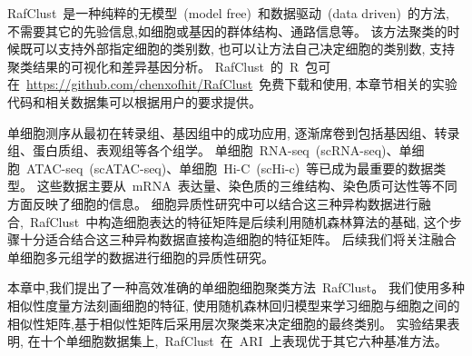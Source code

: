 RafClust~是一种纯粹的无模型~(model free)~和数据驱动~(data driven)~的方法,
不需要其它的先验信息,如细胞或基因的群体结构、通路信息等。
该方法聚类的时候既可以支持外部指定细胞的类别数, 也可以让方法自己决定细胞的类别数,
支持聚类结果的可视化和差异基因分析。
RafClust~的~R~包可在~\url{https://github.com/chenxofhit/RafClust}~免费下载和使用,
本章节相关的实验代码和相关数据集可以根据用户的要求提供。

单细胞测序从最初在转录组、基因组中的成功应用, 逐渐席卷到包括基因组、转录组、蛋白质组、表观组等各个组学。
单细胞~RNA-seq~(scRNA-seq)、单细胞~ATAC-seq~(scATAC-seq)、单细胞~Hi-C~(scHi-c)~等已成为最重要的数据类型。
这些数据主要从~mRNA~表达量、染色质的三维结构、染色质可达性等不同方面反映了细胞的信息。
细胞异质性研究中可以结合这三种异构数据进行融合,~RafClust~中构造细胞表达的特征矩阵是后续利用随机森林算法的基础,
这个步骤十分适合结合这三种异构数据直接构造细胞的特征矩阵。
后续我们将关注融合单细胞多元组学的数据进行细胞的异质性研究。

本章中,我们提出了一种高效准确的单细胞细胞聚类方法~RafClust。
我们使用多种相似性度量方法刻画细胞的特征,
使用随机森林回归模型来学习细胞与细胞之间的相似性矩阵,基于相似性矩阵后采用层次聚类来决定细胞的最终类别。
实验结果表明, 在十个单细胞数据集上,~RafClust~在~ARI~上表现优于其它六种基准方法。


